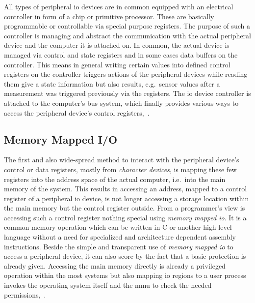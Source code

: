 All types of peripheral \ac{io} devices are in common equipped with an electrical controller in form of a chip or primitive processor.
These are basically programmable or controllable via special purpose registers.
The purpose of such a controller is managing and abstract the communication with the actual peripheral device and the computer it is attached on.
In common, the actual device is managed via control and state registers and in some cases data buffers on the controller.
This means in general writing certain values into defined control registers on the controller triggers actions of the peripheral devices while reading them give a state information but also results, e.g.\ sensor values after a measurement was triggered previously via the registers.
The \ac{io} device controller is attached to the computer's bus system, which finally provides various ways to access the peripheral device's control registers\cite{tanenbaum-modern-operating-systems},~\cite{glatz2015betriebssysteme}. 

\subsection{Memory Mapped I/O}
The first and also wide-spread method to interact with the peripheral device's control or data registers, mostly from \textit{character devices}, is mapping these few registers into the address space of the actual computer, i.e.\ into the main memory of the system.
This results in accessing an address, mapped to a control register of a peripheral \ac{io} device, is not longer accessing a storage location within the main memory but the control register outside.
From a programmer's view is accessing such a control register nothing special using \textit{memory mapped \ac{io}}.
It is a common memory operation which can be written in C or another high-level language without a need for specialized and architecture dependent assembly instructions.
Beside the simple and transparent use of \textit{memory mapped \ac{io}} to access a peripheral device, it can also score by the fact that a basic protection is already given.
Accessing the main memory directly is already a privileged operation within the most systems but also mapping \ac{io} regions to a user process invokes the operating system itself and the \ac{mmu} to check the needed permissions\cite{tanenbaum-modern-operating-systems},~\cite{brause2017betriebssysteme}.  

